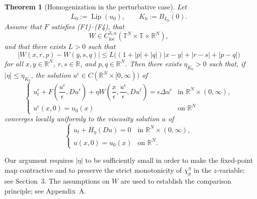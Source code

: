 \documentclass[preprint]{elsarticle}
\newtheorem{result}{\textbf{Theorem}}
\numberwithin{equation}{section}
\begin{document}
\begin{result}[Homogenization in the perturbative case]
Let
\begin{equation*}
L_0:=\operatorname{Lip}(u_0),
\qquad
K_0:=\overline{B_{L_0}(0)}.
\end{equation*}
Assume that $F$ satisfies \textnormal{(F1)}--\textnormal{(F4)}, that
\[
W\in C_{\mathrm{loc}}^{3,\alpha}
(\mathbb T^N\times\mathbb T\times\mathbb R^N),
\]
and that there exists $L>0$ such that
\[
|W(x,r,p)-W(y,s,q)|
\leq
L\big((1+|p|+|q|)|x-y|+|r-s|+|p-q|\big)
\]
for all $x,y\in\mathbb R^N$, $r,s\in\mathbb R$, and $p,q\in\mathbb R^N$. Then there exists $\eta_{K_0}>0$ such that, if $|\eta|\le\eta_{K_0}$, the solution $u^\epsilon \in C(\mathbb R^N\times [0,\infty))$ of
\begin{equation}
\begin{cases}
u_t^\epsilon+
F\left(\dfrac{u^\epsilon}{\epsilon},Du^\epsilon\right)
+
\eta W\left(\dfrac{x}{\epsilon},\dfrac{u^\epsilon}{\epsilon},Du^\epsilon\right)
=\epsilon\Delta u^\epsilon
&\text{in }\mathbb R^N\times(0,\infty),
\\[2mm]
u^\epsilon(x,0)=u_0(x)
&\text{on }\mathbb R^N
\end{cases}
\end{equation}
converges locally uniformly to the viscosity solution $u$ of
\begin{equation}
\begin{cases}
u_t+\overline H_\eta(Du)=0
&\text{in }\mathbb R^N\times(0,\infty),
\\
u(x,0)=u_0(x)
&\text{on }\mathbb R^N.
\end{cases}
\end{equation}
\end{result}

Our argument requires $|\eta|$ to be sufficiently small in order to make the fixed-point map contractive and to preserve the strict monotonicity of $\chi_p^\eta$ in the $z$-variable; see Section~3. The assumptions on $W$ are used to establish the comparison principle; see Appendix~A.
\end{document}
